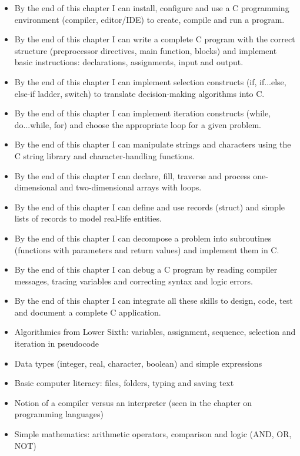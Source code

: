 \documentclass[11pt]{article}
\begin{document}
\begin{objectifs}
\begin{itemize}
\item By the end of this chapter I can install, configure and use a C programming environment (compiler, editor/IDE) to create, compile and run a program.
\item By the end of this chapter I can write a complete C program with the correct structure (preprocessor directives, main function, blocks) and implement basic instructions: declarations, assignments, input and output.
\item By the end of this chapter I can implement selection constructs (if, if...else, else-if ladder, switch) to translate decision-making algorithms into C.
\item By the end of this chapter I can implement iteration constructs (while, do...while, for) and choose the appropriate loop for a given problem.
\item By the end of this chapter I can manipulate strings and characters using the C string library and character-handling functions.
\item By the end of this chapter I can declare, fill, traverse and process one-dimensional and two-dimensional arrays with loops.
\item By the end of this chapter I can define and use records (struct) and simple lists of records to model real-life entities.
\item By the end of this chapter I can decompose a problem into subroutines (functions with parameters and return values) and implement them in C.
\item By the end of this chapter I can debug a C program by reading compiler messages, tracing variables and correcting syntax and logic errors.
\item By the end of this chapter I can integrate all these skills to design, code, test and document a complete C application.
\end{itemize}
\end{objectifs}

\begin{prerequis}
\begin{itemize}
\item Algorithmics from Lower Sixth: variables, assignment, sequence, selection and iteration in pseudocode
\item Data types (integer, real, character, boolean) and simple expressions
\item Basic computer literacy: files, folders, typing and saving text
\item Notion of a compiler versus an interpreter (seen in the chapter on programming languages)
\item Simple mathematics: arithmetic operators, comparison and logic (AND, OR, NOT)
\end{itemize}
\end{prerequis}
\end{document}
